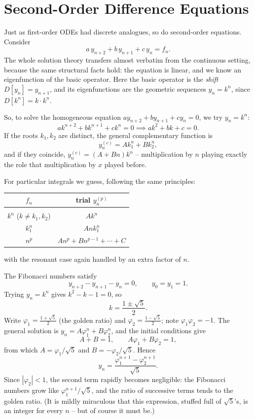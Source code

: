 \section{Second-Order Difference Equations}

Just as first-order ODEs had discrete analogues, so do second-order equations. Consider
$$
a\, y_{n + 2} + b \, y_{n + 1} + c\, y_n = f_n.
$$
The whole solution theory transfers almost verbatim from the continuous setting, because the same structural facts hold: the equation is linear, and we know an eigenfunction of the basic operator. Here the basic operator is the \emph{shift} $D[y_n] = y_{n + 1}$, and its eigenfunctions are the geometric sequences $y_n = k^n$, since $D[k^n] = k \cdot k^n$.

So, to solve the homogeneous equation $a y_{n+2} + by_{n+1} + cy_n = 0$, we try $y_n = k^n$:
$$
a k^{n + 2} + b k^{n+1} + c k^n = 0 \implies ak^2 + bk + c = 0.
$$
If the roots $k_1, k_2$ are distinct, the general complementary function is
$$
y_n^{(c)} = A k_1^n + B k_2^n,
$$
and if they coincide, $y_n^{(c)} = (A + Bn)k^n$ -- multiplication by $n$ playing exactly the role that multiplication by $x$ played before.

For particular integrals we guess, following the same principles:
\begin{center}
	\begin{tabular}{cc}
		$f_n$ & trial $y_n^{(p)}$ \\[2pt]
		\hline \\[-8pt]
		$k^n$ ($k \neq k_1, k_2$) & $A k^n$ \\
		$k_1^n$ & $A n k_1^n$ \\
		$n^p$ & $A n^p + B n^{p - 1} + \cdots + C$
	\end{tabular}
\end{center}
with the resonant case again handled by an extra factor of $n$.

\begin{example}
	The Fibonacci numbers satisfy
	$$
	y_{n + 2} - y_{n + 1} - y_n = 0, \qquad y_0 = y_1 = 1.
	$$
	Trying $y_n = k^n$ gives $k^2 - k - 1 = 0$, so
	$$
	k = \frac{1 \pm \sqrt 5}{2}.
	$$
	Write $\varphi_1 = \frac{1 + \sqrt 5}{2}$ (the golden ratio) and $\varphi_2 = \frac{1 - \sqrt{5}}{2}$; note $\varphi_1 \varphi_2 = -1$. The general solution is $y_n = A \varphi_1^n + B\varphi_2^n$, and the initial conditions give
	$$
	A + B = 1, \qquad A \varphi_1 + B \varphi_2 = 1,
	$$
	from which $A = \varphi_1/\sqrt 5$ and $B = -\varphi_2/\sqrt{5}$. Hence
	$$
	y_n = \frac{\varphi_1^{n + 1} - \varphi_2^{n + 1}}{\sqrt 5}.
	$$
	Since $|\varphi_2| < 1$, the second term rapidly becomes negligible: the Fibonacci numbers grow like $\varphi_1^{n+1}/\sqrt 5$, and the ratio of successive terms tends to the golden ratio. (It is mildly miraculous that this expression, stuffed full of $\sqrt 5$'s, is an integer for every $n$ -- but of course it must be.)
\end{example}

